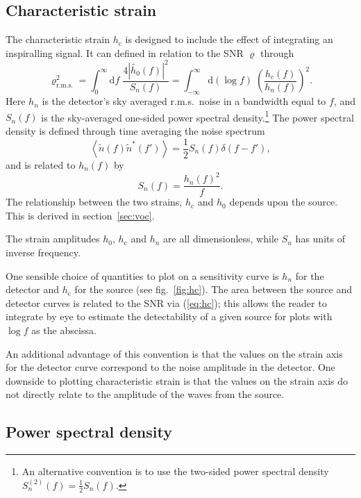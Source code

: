 \documentclass[fleqn,12pt]{iopart}
\newcommand{\dd}{\ensuremath{\mathrm{d}}}
\newcommand{\sub}[1]{\ensuremath{_\mathrm{#1}}}
\begin{document}
\subsection{Characteristic strain}

The characteristic strain $h\sub{c}$ is designed to include the effect of integrating an inspiralling signal. It can defined in relation to the SNR $\varrho$ through
\begin{equation}\label{eq:hc}
\varrho_{\textrm{r.m.s.}}^{2}
= \int_{0}^{\infty}\dd f\; \frac{4\left|\tilde{h_{0}}(f)\right|^{2}}{S_{n}(f)} =
\int_{-\infty}^{\infty} \dd\left(\log f\right)\; \left(\frac{h_{c}(f)}{h_{n}(f)}\right)^{2}.
\end{equation}
Here $h_{n}$ is the detector's sky averaged r.m.s.\ noise in a bandwidth equal to $f$, and $S_n(f)$ is the sky-averaged one-sided power spectral density.\footnote{An alternative convention is to use the two-sided power spectral density $S^{(2)}_{n}(f)=\frac{1}{2}S_{n}(f)$.} The power spectral density is defined through time averaging the noise spectrum
\begin{equation}
\left<\tilde{n}(f)\tilde{n}^*(f')\right> = \frac{1}{2}S_n(f)\delta(f-f'),
\end{equation}
and is related to $h_n(f)$ by
\begin{equation}\label{eq:powerspectraldensity}
S_{n}(f)=\frac{h_{n}(f)^{2}}{f}.
\end{equation}
The relationship between the two strains, $h\sub{c}$ and $h_{0}$ depends upon the source. This is derived in section~\ref{sec:voc}.

The strain amplitudes $h_{0}$, $h\sub{c}$ and $h_{n}$ are all dimensionless, while $S_{n}$ has units of inverse frequency.

One sensible choice of quantities to plot on a sensitivity curve is $h_{n}$ for the detector and $h\sub{c}$ for the source (see fig.~\ref{fig:hc}). The area between the source and detector curves is related to the SNR via (\ref{eq:hc}); this allows the reader to integrate by eye to estimate the detectability of a given source for plots with $\log f$ as the abscissa.

An additional advantage of this convention is that the values on the strain axis for the detector curve correspond to the noise amplitude in the detector. One downside to plotting characteristic strain is that the values on the strain axis do not directly relate to the amplitude of the waves from the source.


\subsection{Power spectral density}\label{sec:psd}
\end{document}
